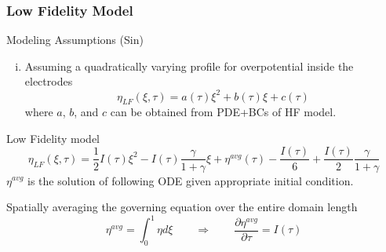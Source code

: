 \documentclass[10pt,xcolor=dvipsnames,compress]{beamer}
\begin{document}
\begin{frame}
\frametitle{Low Fidelity Model}
\vfill


\begin{alertblock}{Modeling Assumptions (Sin)}
\begin{enumerate}[i.]

\item Assuming a quadratically varying profile for overpotential inside the electrodes
\begin{equation*}\label{eq:quadratic}
\eta_{LF} (\xi,\tau)= a(\tau)\xi^2 + b(\tau)\xi + c(\tau)
\end{equation*}
where $a$, $b$, and $c$ can be obtained from PDE+BCs of HF model.

\end{enumerate}
\end{alertblock}

\begin{block}{Low Fidelity model}
\begin{equation*}\label{eq:LF}
\eta_{LF}(\xi,\tau) = 
\frac{1}{2}I(\tau)\xi^2 - I(\tau) \frac{\gamma}{1+\gamma}\xi + {\eta}^{avg}(\tau) - \frac{I(\tau)}{6} + \frac{I(\tau)}{2}\frac{\gamma}{1+\gamma}
\end{equation*}
${\eta}^{avg}$ is the solution of following ODE given appropriate initial condition.

Spatially
averaging the governing equation over the entire domain length
%
\begin{equation*}\label{eq:LF_avg}
\eta^{avg} = \int_0^1 \eta d\xi \qquad \Rightarrow \qquad
\frac{\partial{\eta}^{avg}}{\partial\tau} = I(\tau)
\end{equation*}
\end{block}


\vfill
\end{frame}
\end{document}
